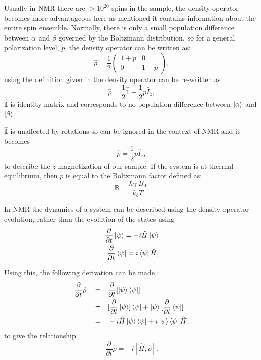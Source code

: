 Usually in NMR there are $>10^{20}$ spins in the sample, the density operator becomes more advantageous here
as mentioned it contains information about the entire spin ensemble. Normally, there is only a small population difference between $\alpha$ and $\beta$
governed by the Boltzmann distribution,
so for a general polarization level, $p$, the density operator can be written as:
\begin{equation}
  \hat\rho = \frac{1}{2}\begin{pmatrix}
    1 + p & 0\\
    0 & 1 - p
\end{pmatrix},
\end{equation}
using the definition given in  the density operator can be re-written as
\begin{equation}
  \hat\rho = \frac{1}{2}\hat{\mathbb{1}} + \frac{1}{2}p\hat{I}_z,
\end{equation}
$\hat{\mathbb{1}}$ is identity matrix and corresponds to no population difference between $\ket{\alpha}$ and $\ket{\beta}$.

$\hat{\mathbb{1}}$ is unaffected by rotations so can be ignored in the context of NMR
and it becomes
\begin{equation}
  \hat{\rho} = \frac{1}{2}p\hat{I}_z,
\end{equation}
to describe the $z$ magnetization of our sample. If the system is at thermal equilibrium,
then $p$ is equal to the Boltzmann factor defined as:
\begin{equation}
  \mathbb{B} = \frac{\hbar\gamma~B_0}{k_bT}.
\end{equation}


In NMR the dynamics of a system can be described using the density operator evolution, rather than the evolution of the states using
\begin{align}
  \frac{\partial}{\partial{t}}\ket{\psi} = -i\hat{H}\ket{\psi}\\
  \frac{\partial}{\partial{t}}\bra{\psi} = i\bra{\psi}\hat{H},
\end{align}

Using this, the following derivation can be made \citep{Neumann2018}:
\begin{align}
  \frac{\partial}{\partial{t}}\hat\rho\quad=&\quad \frac{\partial}{\partial{t}}[\ket{\psi}\bra{\psi}]\\
  =&\quad[\frac{\partial}{\partial{t}}\ket{\psi}]\bra{\psi} + \ket{\psi}[\frac{\partial}{\partial{t}}\bra{\psi}]\\
  =&\quad-i\hat{H}\ket{\psi}\bra{\psi} + i\ket{\psi}\bra{\psi}\hat{H},
\end{align}
to give the relationship
\begin{equation}
  \frac{\partial}{\partial{t}}\hat\rho = -i[\hat{H},\hat\rho].
\end{equation}

